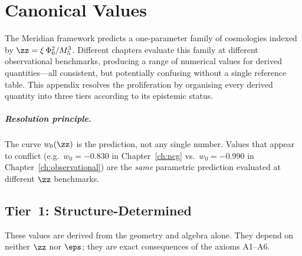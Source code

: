 
\chapter{Canonical Values}
\label{app:values}

The Meridian framework predicts a one-parameter family of cosmologies indexed by $\zz = \xi\,\Phi_0^2/M_5^3$. Different chapters evaluate this family at different observational benchmarks, producing a range of numerical values for derived quantities---all consistent, but potentially confusing without a single reference table. This appendix resolves the proliferation by organising every derived quantity into three tiers according to its epistemic status.

\paragraph{Resolution principle.} The curve $w_0(\zz)$ is the prediction, not any single number. Values that appear to conflict (e.g.\ $w_0 = -0.830$ in Chapter~\ref{ch:ncg} vs.\ $w_0 = -0.990$ in Chapter~\ref{ch:observational}) are the \emph{same} parametric prediction evaluated at different $\zz$ benchmarks.

\section{Tier~1: Structure-Determined}
\label{app:val-tier1}

These values are derived from the geometry and algebra alone. They depend on neither $\zz$ nor $\eps$; they are exact consequences of the axioms A1--A6.


